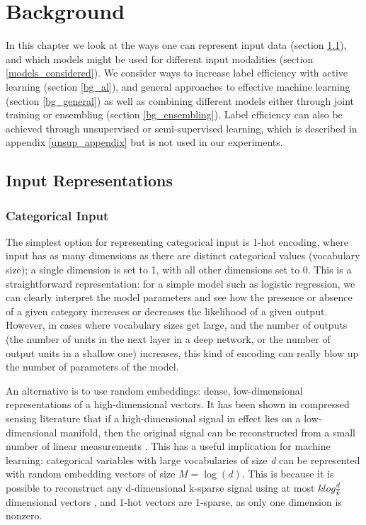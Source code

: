 \chapter{Background}
\label{bg}

In this chapter we look at the ways one can represent input data (section \ref{data_rep}), and which models might be used for different input modalities (section \ref{models_considered}). We consider ways to increase label efficiency with active learning (section \ref{bg_al}), and general approaches to effective machine learning (section \ref{bg_general}) as well as combining different models either through joint training or ensembling (section \ref{bg_ensembling}).
Label efficiency can also be achieved through unsupervised or semi-supervised learning, which is described in appendix \ref{unsup_appendix} but is not used in our experiments.

\section{Input Representations}
\label{data_rep}

\subsection{Categorical Input}

The simplest option for representing categorical input is 1-hot encoding, where input has as many dimensions as there are distinct categorical values (vocabulary size); a single dimension is set to 1, with all other dimensions set to 0.
This is a straightforward representation: for a simple model such as logistic regression, we can clearly interpret the model parameters and see how the presence or absence of a given category increases or decreases the likelihood of a given output.
However, in cases where vocabulary sizes get  large, and the number of outputs (the number of units in the next layer in a deep network,  or the number of output units  in a shallow one) increases, this kind of encoding can really blow up the number of parameters of the model.

An alternative is to use  random embeddings:  dense, low-dimensional representations of a high-dimensional vectors.
It has been shown in compressed sensing literature that if a high-dimensional signal in effect lies on a low-dimensional manifold, then the original signal can be reconstructed from a small number of linear measurements \cite{compressive_sensing2}.
This has a useful implication for machine learning: categorical variables with large vocabularies of size \textit{d}  can be  represented with  random embedding vectors of size $M = \log(d)$.
This is because it is possible to reconstruct any d-dimensional k-sparse signal using at most $k  log{\frac{d}{k}}$ dimensional vectors \cite{compressive_sensing1}, and 1-hot vectors are 1-sparse, as only one dimension is nonzero.

